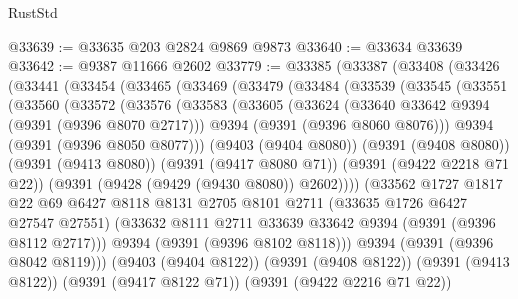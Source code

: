 \begin{lexlean}{RustStd}
\begin{coremodule}
@33639 := @33635 @203 @2824 @9869 @9873
@33640 := @33634 @33639
@33642 := @9387 @11666 @2602
@33779 := @33385
    (@33387
      (@33408
        (@33426
          (@33441
            (@33454
              (@33465
                (@33469
                  (@33479
                    (@33484
                      (@33539
                        (@33545
                          (@33551
                            (@33560
                              (@33572
                                (@33576
                                  (@33583
                                    (@33605
                                      (@33624
                                        (@33640 @33642 @9394 (@9391 (@9396 @8070 @2717)))
                                        @9394
                                        (@9391 (@9396 @8060 @8076)))
                                      @9394
                                      (@9391 (@9396 @8050 @8077)))
                                    (@9403 (@9404 @8080))
                                    (@9391 (@9408 @8080))
                                    (@9391 (@9413 @8080))
                                    (@9391 (@9417 @8080 @71))
                                    (@9391 (@9422 @2218 @71 @22))
                                    (@9391 (@9428 (@9429 (@9430 @8080)) @2602))))
                                (@33562
                                  @1727
                                  @1817
                                  @22
                                  @69
                                  @6427
                                  @8118
                                  @8131
                                  @2705
                                  @8101
                                  @2711
                                  (@33635 @1726 @6427 @27547 @27551)
                                  (@33632
                                    @8111
                                    @2711
                                    @33639
                                    @33642
                                    @9394
                                    (@9391 (@9396 @8112 @2717)))
                                  @9394
                                  (@9391 (@9396 @8102 @8118)))
                                @9394
                                (@9391 (@9396 @8042 @8119)))
                              (@9403 (@9404 @8122))
                              (@9391 (@9408 @8122))
                              (@9391 (@9413 @8122))
                              (@9391 (@9417 @8122 @71))
                              (@9391 (@9422 @2216 @71 @22))

\end{coremodule}
\end{lexlean}
